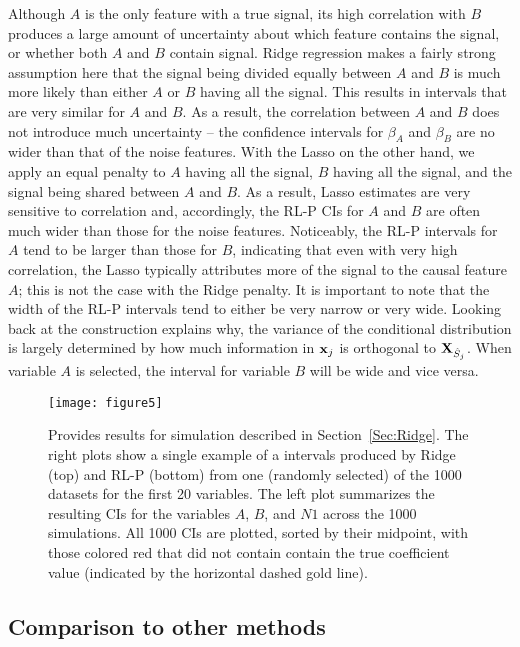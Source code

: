 Although $A$ is the only feature with a true signal, its high correlation with $B$ produces a large amount of uncertainty about which feature contains the signal, or whether both $A$ and $B$ contain signal. Ridge regression makes a fairly strong assumption here that the signal being divided equally between $A$ and $B$ is much more likely than either $A$ or $B$ having all the signal. This results in intervals that are very similar for $A$ and $B$. As a result, the correlation between $A$ and $B$ does not introduce much uncertainty -- the confidence intervals for $\beta_A$ and $\beta_B$ are no wider than that of the noise features. With the Lasso on the other hand, we apply an equal penalty to $A$ having all the signal, $B$ having all the signal, and the signal being shared between $A$ and $B$. As a result, Lasso estimates are very sensitive to correlation and, accordingly, the RL-P CIs for $A$ and $B$ are often much wider than those for the noise features. Noticeably, the RL-P intervals for $A$ tend to be larger than those for $B$, indicating that even with very high correlation, the Lasso typically attributes more of the signal to the causal feature $A$; this is not the case with the Ridge penalty. It is important to note that the width of the RL-P intervals tend to either be very narrow or very wide. Looking back at the construction explains why, the variance of the conditional distribution is largely determined by how much information in $\mathbf{x}_j$ is orthogonal to $\mathbf{X}_{\hat{S}_j}$. When variable $A$ is selected, the interval for variable $B$ will be wide and vice versa.

\begin{figure}[htb!]
  \begin{center}
    \texttt{[image: figure5]}
    \caption{\label{Fig:highcorr} Provides results for simulation described in Section~\ref{Sec:Ridge}. The right plots show a single example of a intervals produced by Ridge (top) and RL-P (bottom) from one (randomly selected) of the 1000 datasets for the first 20 variables. The left plot summarizes the resulting CIs for the variables $A$, $B$, and $N1$ across the 1000 simulations. All 1000 CIs are plotted, sorted by their midpoint, with those colored red that did not contain contain the true coefficient value (indicated by the horizontal dashed gold line).}
  \end{center}
\end{figure}

\subsection{Comparison to other methods} \label{Sec:Comparison}

